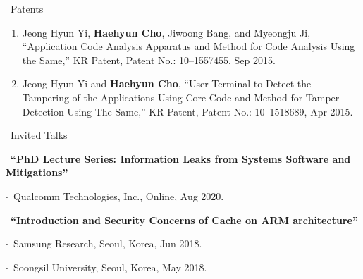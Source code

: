 \documentclass{resume} %
\begin{document}
\begin{rSection}{\faGenderless~Patents}
	
    \begin{enumerate}[leftmargin=0pt]
		\item Jeong Hyun Yi, \textbf{Haehyun Cho}, Jiwoong Bang, and Myeongju Ji,
		``Application Code Analysis Apparatus and Method for Code Analysis Using the Same,'' KR Patent, 
		Patent No.: 10--1557455, Sep 2015.

		\item Jeong Hyun Yi and \textbf{Haehyun Cho}, 
		``User Terminal to Detect the Tampering of the Applications Using Core Code and Method for Tamper Detection Using The Same,'' KR Patent, 
		Patent No.: 10--1518689, Apr 2015.
	\end{enumerate}
	
	\vspace{3mm}
\end{rSection}


\begin{rSection}{\faGenderless~Invited Talks}

    \strut\textbullet~{\bf ``PhD Lecture Series: Information Leaks from Systems Software and Mitigations''}\\
    \strut\hspace{1cm}$\cdot$~Qualcomm Technologies, Inc., Online, Aug 2020.\\
	
    \strut\textbullet~{\bf ``Introduction and Security Concerns of Cache on ARM architecture''}\\
	\strut\hspace{1cm}$\cdot$~Samsung Research, Seoul, Korea, Jun 2018.\\
	\strut\hspace{1cm}$\cdot$~Soongsil University, Seoul, Korea, May 2018.

	\vspace{3mm}
\end{rSection}
\end{document}
